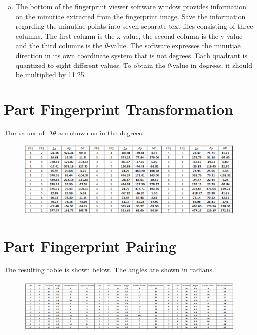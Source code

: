 \documentclass[a4paper]{article}
\begin{document}
\begin{spacing}{2.0}
\begin{enumerate}[(a)]
	\item The bottom of the fingerprint viewer software window provides information on the minutiae extracted from the fingerprint image. Save the information regarding the minutiae points into seven separate text files consisting of three columns. The first column is the x-value, the second column is the y-value and the third columns is the $\theta$-value. The software expresses the minutiae direction in its own coordinate system that is not degrees. Each quadrant is quantized to eight different values. To obtain the $\theta$-value in degrees, it should be multiplied by 11.25.
	\end{enumerate}
	
\section*{\huge\textbf{ Part \uppercase\expandafter{} Fingerprint Transformation}  }
	\normalsize
	The values of $\Delta \theta$ are shown as in the degrees.
	\begin{figure}[htbp]
	\centering
	\includegraphics[width = 7.5in]{table1withAngle.png}
	\label{f1}
	\end{figure}
	
\newpage	
\section*{\huge\textbf{ Part \uppercase\expandafter{} Fingerprint Pairing}  }
	\normalsize
	The resulting table is shown below. The angles are shown in radians.
	
	\begin{figure}[htbp]
	\centering
	\includegraphics[width = 7.5in]{table2_20.png}
	\label{t}
	\end{figure}
	

\end{spacing}
\end{document}
